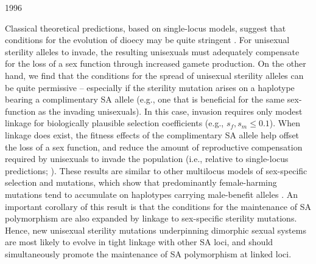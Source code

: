 1996\documentclass[9pt,twocolumn,twoside,lineno]{gsajnl}
\begin{document}
Classical theoretical predictions, based on single-locus models, suggest that conditions for the evolution of dioecy may be quite stringent \citep{Lloyd1975,Lloyd1976,Charlesworth1978a,KaferPannell2017}. For unisexual sterility alleles to invade, the resulting unisexuals must adequately compensate for the loss of a sex function through increased gamete production. On the other hand, we find that the conditions for the spread of unisexual sterility alleles can be quite permissive -- especially if the sterility mutation arises on a haplotype bearing a complimentary SA allele (e.g., one that is beneficial for the same sex-function as the invading unisexuals). In this case, invasion requires only modest linkage for biologically plausible selection coefficients (e.g., $s_f,s_m \leq 0.1$). When linkage does exist, the fitness effects of the complimentary SA allele help offset the loss of a sex function, and reduce the amount of reproductive compensation required by unisexuals to invade the population (i.e., relative to single-locus predictions; \citealt{Charlesworth1978a}). These results are similar to other multilocus models of sex-specific selection and mutations, which show that predominantly female-harming mutations tend to accumulate on haplotypes carrying male-benefit alleles \citep{ConnallonJordan2016}. An important corollary of this result is that the conditions for the maintenance of SA polymorphism are also expanded by linkage to sex-specific sterility mutations. Hence, new unisexual sterility mutations underpinning dimorphic sexual systems are most likely to evolve in tight linkage with other SA loci, and should simultaneously promote the maintenance of SA polymorphism at linked loci. 
\end{document}
